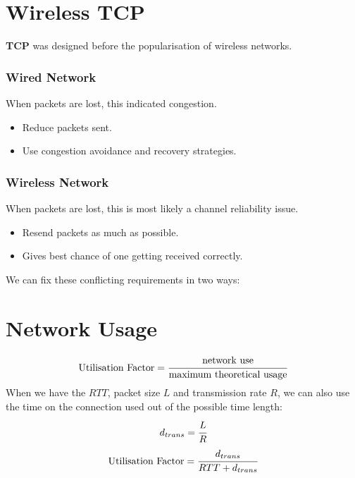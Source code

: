 \section{Wireless TCP}
\textbf{TCP} was designed before the popularisation of wireless networks.
\\ \begin{minipage}{0.47\textwidth}
    \subsubsection{Wired Network}
    When packets are lost, this indicated congestion.
    \begin{itemize}
        \setlength\itemsep{0em}
        \item Reduce packets sent.
        \item Use congestion avoidance and recovery strategies.
    \end{itemize}
\end{minipage}
\hfill
\begin{minipage}{0.47\textwidth}
    \subsubsection{Wireless Network}
    When packets are lost, this is most likely a channel reliability issue.
    \begin{itemize}
        \setlength\itemsep{0em}
        \item Resend packets as much as possible.
        \item Gives best chance of one getting received correctly.
    \end{itemize}
\end{minipage}
We can fix these conflicting requirements in two ways:
\begin{itemize}
    \setlength\itemsep{0em}
\end{itemize}

\section{Network Usage}
\[\text{Utilisation Factor} = \cfrac{\text{network use}}{\text{maximum theoretical usage}}\]
When we have the $RTT$, packet size $L$ and transmission rate $R$, we can also use the time on the connection used out of the possible time length:
\[d_{trans} = \cfrac{L}{R}\]
\[\text{Utilisation Factor} = \cfrac{d_{trans}}{RTT + d_{trans}}\]
